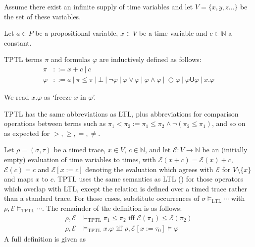\documentclass[a4paper]{article}
\newcommand{\U}{\mathsf{U}}
\newcommand{\tiff}{\text{ iff }}
\newcommand{\eval}{\mathcal{E}}
\begin{document}
Assume there exist an infinite supply of time variables  and let $V=\{x,y,z\dots\}$ be the set of these variables.

\begin{defn}\label{tptlsyn}
  Let $a\in P$ be a propositional variable, $x\in V$ be a time variable and $c\in\mathbb{N}$ a constant.

  TPTL terms $\pi$ and formulas $\varphi$ are inductively defined as follows:
  \begin{align*}
    \pi &::= x + c ~|~ c\\
    \varphi &::= a ~|~ \pi \leq \pi ~|~ \bot ~|~ \neg \varphi ~|~\varphi \lor \varphi ~|~ \varphi \land \varphi ~|~ \bigcirc \varphi ~|~ \varphi \U \varphi ~|~ x. \varphi
  \end{align*}
\end{defn}

We read $x. \varphi$ as `freeze $x$ in $\varphi$'.

\begin{notn}[Abbreviations]\label{tptlabbrev}

  TPTL has the same abbreviations as LTL, plus abbreviations for comparison operations between terms such as $\pi_1 < \pi_2 := \pi_1 \leq \pi_2 \land \neg(\pi_2 \leq \pi_1)$, and so on as expected for $>,\geq,=,\neq$.
\end{notn}

\begin{defn}\label{tptlsem}

  Let $\rho = (\sigma,\tau)$ be a timed trace, $x\in V$, $c\in\mathbb{N}$, and let $\eval:V\to\mathbb{N}$ be an (initially empty) evaluation of time variables to times, with $\eval(x + c) = \eval(x) + c$, $\eval(c) = c$ and $\eval[x:=c]$ denoting the evaluation which agrees with $\eval$ for $V\setminus\{x\}$ and maps $x$ to $c$.
  TPTL uses the same semantics as LTL () for those operators which overlap with LTL, except the relation is defined over a timed trace rather than a standard trace. For those cases, substitute occurrences of $\sigma\vDash_{\text{LTL}}\cdots$ with $\rho,\eval\vDash_{\text{TPTL}}\cdots$. The remainder of the definition is as follows:
  \begin{align*}
    \rho,\eval &\vDash_{\text{TPTL}}\pi_1\leq\pi_2 \tiff \eval(\pi_1)\leq\eval(\pi_2)\\
    \rho,\eval &\vDash_{\text{TPTL}} x.\varphi \tiff \rho,\eval[x:=\tau_0]\vDash\varphi
  \end{align*}
  A full definition is given as 
\end{defn}
\end{document}
